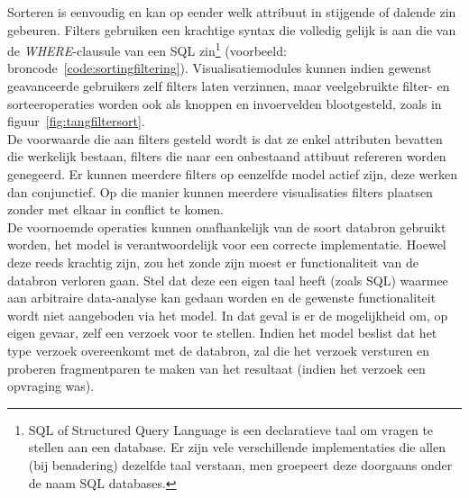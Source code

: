 Sorteren is eenvoudig en kan op eender welk attribuut in stijgende of dalende zin gebeuren. Filters gebruiken een krachtige syntax die volledig gelijk is aan die van de \emph{WHERE}-clausule van een SQL zin\footnote{SQL of Structured Query Language is een declaratieve taal om vragen te stellen aan een database. Er zijn vele verschillende implementaties die allen (bij benadering) dezelfde taal verstaan, men groepeert deze doorgaans onder de naam SQL databases.} (voorbeeld: broncode~\ref{code:sortingfiltering}). Visualisatiemodules kunnen indien gewenst geavanceerde gebruikers zelf filters laten verzinnen, maar veelgebruikte filter- en sorteeroperaties worden ook als knoppen en invoervelden blootgesteld, zoals in figuur~\ref{fig:tangfiltersort}.\\

De voorwaarde die aan filters gesteld wordt is dat ze enkel attributen bevatten die werkelijk bestaan, filters die naar een onbestaand attibuut refereren worden genegeerd. Er kunnen meerdere filters op eenzelfde model actief zijn, deze werken dan conjunctief. Op die manier kunnen meerdere visualisaties filters plaatsen zonder met elkaar in conflict te komen.\\

De voornoemde operaties kunnen onafhankelijk van de soort databron gebruikt worden, het model is verantwoordelijk voor een correcte implementatie. Hoewel deze reeds krachtig zijn, zou het zonde zijn moest er functionaliteit van de databron verloren gaan. Stel dat deze een eigen taal heeft (zoals SQL) waarmee aan arbitraire data-analyse kan gedaan worden en de gewenste functionaliteit wordt niet aangeboden via het model. In dat geval is er de mogelijkheid om, op eigen gevaar, zelf een verzoek voor te stellen. Indien het model beslist dat het type verzoek overeenkomt met de databron, zal die het verzoek versturen en proberen fragmentparen te maken van het resultaat (indien het verzoek een opvraging was).



